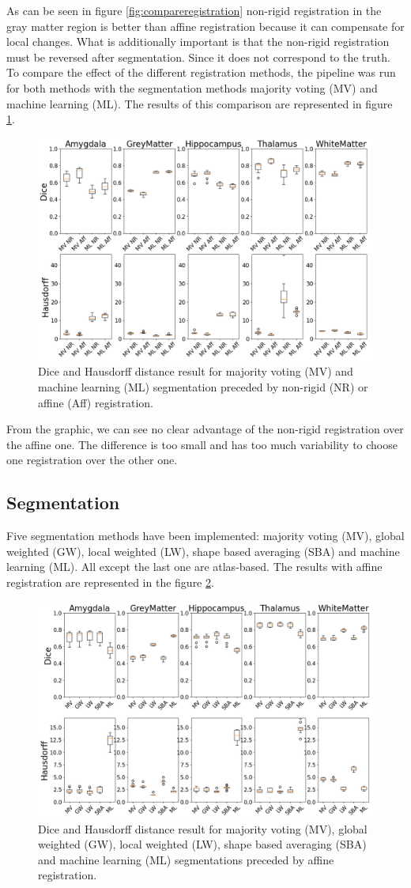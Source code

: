 As can be seen in figure \ref{fig:compareregistration} non-rigid registration in the gray matter region is better than affine registration because it can compensate for local changes. What is additionally important is that the non-rigid registration must be reversed after segmentation. Since it does not correspond to the truth.
To compare the effect of the different registration methods, the pipeline was run for both methods with the segmentation methods majority voting (MV) and machine learning (ML). The results of this comparison are represented in figure \ref{fig:boxplotReg}.

\begin{figure}[h!]
	\centering
	\includegraphics[width = .48 \textwidth]{img/boxplotComparisonNRAff2}
	\caption{Dice and Hausdorff distance result for majority voting (MV) and machine learning (ML) segmentation preceded by non-rigid (NR) or affine (Aff) registration.}
	\label{fig:boxplotReg}
\end{figure}

From the graphic, we can see no clear advantage of the non-rigid registration over the affine one. The difference is too small and has too much variability to choose one registration over the other one.

\subsection*{Segmentation}
Five segmentation methods have been implemented: majority voting (MV), global weighted (GW), local weighted (LW), shape based averaging (SBA) and machine learning (ML). All except the last one are atlas-based. The results with affine registration are represented in the figure \ref{fig:boxplotAff}.

\begin{figure}[h!]
	\centering
	\includegraphics[width = .48 \textwidth]{img/boxplot_Affine_all2}
	\caption{Dice and Hausdorff distance result for majority voting (MV), global weighted (GW), local weighted (LW), shape based averaging (SBA) and machine learning (ML) segmentations preceded by affine registration.}
	\label{fig:boxplotAff}
\end{figure}

